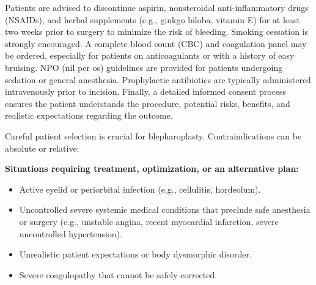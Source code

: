 Patients are advised to discontinue aspirin, nonsteroidal anti-inflammatory drugs (NSAIDs), and herbal supplements (e.g., ginkgo biloba, vitamin E) for at least two weeks prior to surgery to minimize the risk of bleeding. Smoking cessation is strongly encouraged. A complete blood count (CBC) and coagulation panel may be ordered, especially for patients on anticoagulants or with a history of easy bruising. NPO (nil per os) guidelines are provided for patients undergoing sedation or general anesthesia. Prophylactic antibiotics are typically administered intravenously prior to incision. Finally, a detailed informed consent process ensures the patient understands the procedure, potential risks, benefits, and realistic expectations regarding the outcome.

Careful patient selection is crucial for blepharoplasty. Contraindications can be absolute or relative:

\textbf{Situations requiring treatment, optimization, or an alternative plan:}
\begin{itemize}
  \item Active eyelid or periorbital infection (e.g., cellulitis, hordeolum).
  \item Uncontrolled severe systemic medical conditions that preclude safe anesthesia or surgery (e.g., unstable angina, recent myocardial infarction, severe uncontrolled hypertension).
  \item Unrealistic patient expectations or body dysmorphic disorder.
  \item Severe coagulopathy that cannot be safely corrected.
\end{itemize}

